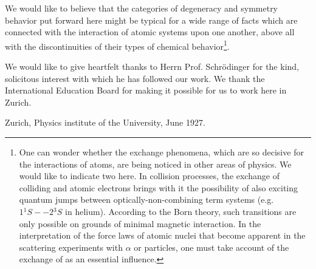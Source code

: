 \begin{paper}{1}
We would like to believe that the categories of degeneracy and symmetry behavior put forward here might be typical for a wide range of facts which are connected with the interaction of atomic systems upon one another, above all with the discontinuities of their types of chemical behavior\footnote{One can wonder whether the exchange phenomena, which are so decisive for the interactions of atoms, are being noticed in other areas of physics. We would like to indicate two here. In collision processes, the exchange of colliding and atomic electrons brings with it the possibility of also exciting quantum jumps between optically-non-combining term systems (e.g. $1{{}^1 S}--2{{}^3S}$ in helium). According to the Born theory, such transitions are only possible on grounds of minimal magnetic interaction. In the interpretation of the force laws of atomic nuclei that become apparent in the scattering experiments with $\alpha$ or  particles, one must take account of the exchange of  as an essential influence.}.

We would like to give heartfelt thanks to Herrn Prof. Schrödinger for the kind, solicitous interest with which he has followed our work. We thank the International Education Board for making it possible for us to work here in Zurich.

Zurich, Physics institute of the University, June 1927. 



\end{paper}